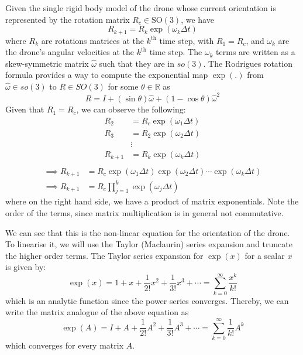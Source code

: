 Given the single rigid body model of the drone whose current orientation is represented by the rotation matrix \( R_c \in \text{SO}(3) \), we have
\begin{equation*}
    R_{k+1}
    =
    R_k \exp(\omega_k \Delta t)
\end{equation*}
where \( R_k \) are rotations matrices at the \( k^{\text{th}} \) time step, with \( R_{1} = R_c \), and \( \omega_k \) are the drone's angular velocities at the \( k^{\text{th}} \) time step.
The \( \omega_k \) terms are written as a skew-symmetric matrix \( \hat\omega \) such that they are in \( so(3) \).
The Rodrigues rotation formula provides a way to compute the exponential map \( \exp(.) \) from \( \hat \omega \in so(3)\) to \( R \in SO(3)\) for some \( \theta \in \mathbb{R} \) as
\[
    R = I +(\sin \theta )\hat\omega +(1-\cos \theta )\hat\omega^2
\]
Given that \( R_{1} = R_c \), we can observe the following:
\begin{align*}
    R_{2}
     & =
    R_{c} \exp(\omega_1 \Delta t)
    \\
    R_{3}
     & =
    R_{2} \exp(\omega_2 \Delta t)
    \\ &
    \vdots
    \\
    R_{k+1}
     & =
    R_{k} \exp(\omega_k \Delta t)
    \\
\end{align*}
\begin{align*}
    \implies
    R_{k+1}
     & =
    R_c \exp(\omega_1 \Delta t) \exp(\omega_2 \Delta t) \cdots \exp(\omega_k \Delta t)
    \\
    \implies
    R_{k+1}
     & =
    R_c \prod_{j=1}^{k} \exp(\omega_j \Delta t)
\end{align*}
where on the right hand side, we have a product of matrix exponentials.
Note the order of the terms, since matrix multiplication is in general not commutative.

We can see that this is the non-linear equation for the orientation of the drone.
To linearise it, we will use the Taylor (Maclaurin) series expansion and truncate the higher order terms.
The Taylor series expansion for \( \exp(x) \) for a scalar \( x \) is given by:
\begin{equation*}
    \exp(x)
    =
    1 + x + \frac{1}{2!} x^2 + \frac{1}{3!} x^3 + \cdots
    =
    \sum_{k=0}^{\infty} \frac{x^k}{k!}
\end{equation*}
which is an analytic function since the power series converges.
Thereby, we can write the matrix analogue of the above equation as
\begin{equation*}
    \exp(A)
    =
    I + A + \frac{1}{2!} A^2 + \frac{1}{3!} A^3 + \cdots
    =
    \sum_{k=0}^{\infty} \frac{1}{k!} A^k
\end{equation*}
which converges for every matrix \( A \).

